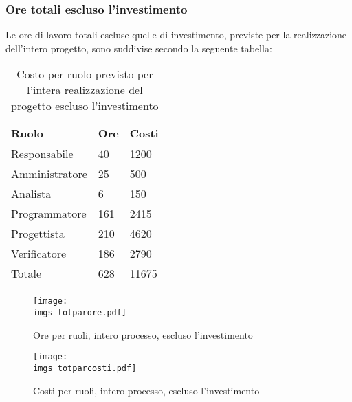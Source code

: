 {{	\subsubsection{Ore totali escluso l’investimento}{
		Le ore di lavoro totali escluse quelle di investimento, previste per la realizzazione dell’intero progetto, sono suddivise secondo la seguente tabella:
		\begin{table}[H]
			 \centering
			 \begin{tabular}{p{}p{}
				  		  				p{}}
				  \toprule Ruolo & Ore  & Costi \\
				  \midrule
				  Responsabile & 40  & 1200 \\
				  Amministratore & 25  & 500 \\
				  Analista & 6   & 150 \\
				  Programmatore & 161  & 2415 \\
				  Progettista & 210  & 4620 \\
				  Verificatore & 186  & 2790 \\
				  Totale & 628  & 11675 \\
				  \bottomrule
			 \end{tabular}
			 \label{tab:costonoinvestimento}
			 \caption{Costo per ruolo previsto per l’intera realizzazione del progetto escluso l’investimento}
		\end{table}
		
		\begin{figure}[H]
			\centering
			\texttt{[image: \\imgs totparore.pdf]}
			\label{fig:orenoinvestimento}
			\caption{Ore per ruoli, intero processo, escluso l’investimento}
		\end{figure}
		\begin{figure}[H]
			\centering
			\texttt{[image: \\imgs totparcosti.pdf]}
			\label{fig:costonoinvestimento}
			\caption{Costi per ruoli, intero processo, escluso l’investimento}
		\end{figure}
	}
}
}